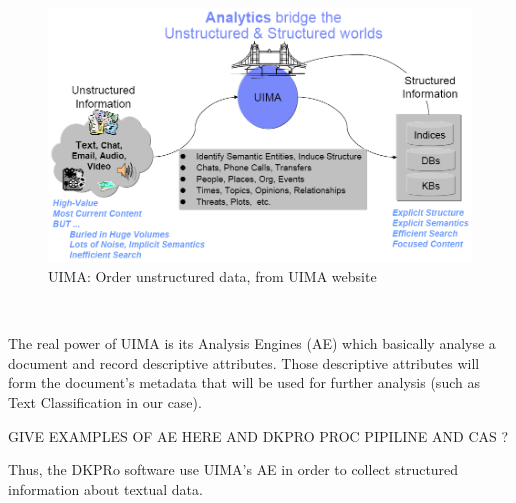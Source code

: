 \
\begin{figure}[ht]
    \centering
    \includegraphics[width=1\textwidth]{fig/uima.png}
    \caption[Short caption]{UIMA: Order unstructured data, from UIMA website \cite{uima:Online}}
    \label{fig:uima}
\end{figure}
\

The real power of UIMA is its Analysis Engines (AE) which basically analyse a document and record descriptive attributes. Those descriptive attributes will form the document's metadata that will be used for further analysis (such as Text Classification in our case).

GIVE EXAMPLES OF AE HERE AND DKPRO PROC PIPILINE AND CAS ?

Thus, the DKPRo software use UIMA's AE in order to collect structured information about textual data. 
